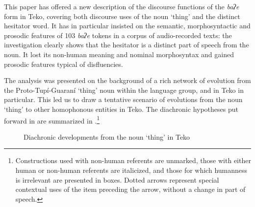 \documentclass[output=paper]{langscibook}
\begin{document}
This paper has offered a new description of the discourse functions of the
\textit{baʔe} form in Teko, covering both discourse uses of the noun ‘thing’ and the distinct hesitator word. It has in particular insisted on the semantic, morphosyntactic and prosodic features of 103 \textit{baʔe} tokens in a corpus of audio-recorded texts: the investigation clearly shows that the hesitator is a distinct part of speech from the noun. It lost its non-human meaning and nominal morphosyntax and gained prosodic features typical of disfluencies.


The analysis was presented on the background of a rich network of evolution from the Proto-Tupí-Guaraní ‘thing’ noun within the language group, and in Teko in particular. This led us to draw a tentative scenario of evolutions from the noun ‘thing’ to other homophonous entities in Teko. The diachronic hypotheses put forward in  are summarized in .\footnote{Constructions used with non-human referents are unmarked, those with either human or non-human referents are italicized, and those for which humanness is irrelevant are presented in boxes.  Dotted arrows represent special contextual uses of the item preceding the arrow, without a change in part of speech.}

\begin{figure}
\caption{\label{fig:rose:7}Diachronic developments from the noun ‘thing’ in Teko}
\end{figure}
\end{document}
